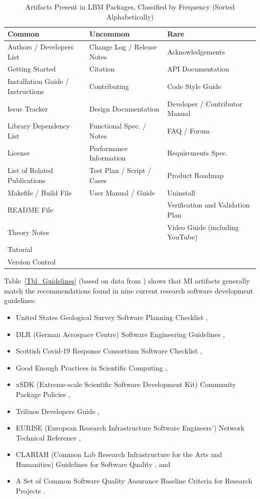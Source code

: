 \documentclass[final, 3p, times, authoryear]{elsarticle}
\begin{document}
\begin{table}[ht!]
\begin{center}
\begin{tabular}{ p{5.3 cm} p{4.9 cm} p{5 cm}}
\toprule
\textbf{Common} & \textbf{Uncommon} & \textbf{Rare} \\
\midrule
Authors / Developers List & Change Log / Release Notes & Acknowledgements\\
Getting Started & Citation & API Documentation\\
Installation Guide / Instructions & Contributing & Code Style Guide\\
Issue Tracker & Design Documentation & Developer / Contributor Manual\\
Library Dependency List & Functional Spec. / Notes & FAQ / Forum\\
License & Performance Information & Requirements Spec.\\
List of Related Publications & Test Plan / Script / Cases & Product Roadmap\\
Makefile / Build File & User Manual / Guide & Uninstall\\
README File & & Verification and Validation Plan\\
Theory Notes & & Video Guide (including YouTube)\\
Tutorial & & \\
Version Control & & \\
\bottomrule
\end{tabular}
\caption{Artifacts Present in LBM Packages, Classified by Frequency (Sorted Alphabetically)}
\label{artifactspresent}
\end{center}
\end{table}

Table~\ref{Tbl_Guidelines} (based on data from \citep{SmithAndMichalski2022})
shows that MI artifacts generally match the recommendations found in nine
current research software development guidelines:
\begin{itemize}
\item United States Geological Survey Software Planning Checklist
\citep{USGS2019},
\item DLR (German Aerospace Centre) Software Engineering Guidelines
\citep{TobiasEtAl2018}, 
\item Scottish Covid-19 Response Consortium Software Checklist
\citep{BrettEtAl2021},
\item Good Enough Practices in Scientific Computing \citep{WilsonEtAl2016},
\item xSDK (Extreme-scale Scientific Software Development Kit) Community Package
Policies \citep{SmithAndRoscoe2018},
\item Trilinos Developers Guide \citep{HerouxEtAl2008},
\item EURISE (European Research Infrastructure Software Engineers') Network
Technical Reference \citep{ThielEtAl2020},
\item CLARIAH (Common Lab Research Infrastructure for the Arts and Humanities)
Guidelines for Software Quality \citep{vanGompelEtAl2016}, and
\item A Set of Common Software Quality Assurance Baseline Criteria for Research
Projects \citep{OrvizEtAl2017}.
\end{itemize}
\end{document}

